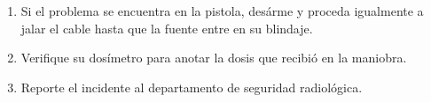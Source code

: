 
\begin{enumerate}[resume]
  \item Si el problema se encuentra en la pistola, desárme y proceda igualmente a jalar el cable hasta que la fuente entre en su blindaje.
  \item Verifique su dosímetro para anotar la dosis que recibió en la maniobra.
  \item Reporte el incidente al departamento de seguridad radiológica.
\end{enumerate}
